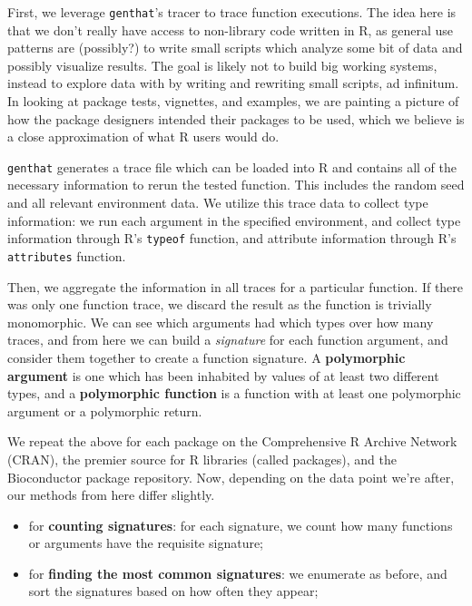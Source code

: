 \documentclass[acmsmall,10pt,review,anonymous]{acmart}\settopmatter{printfolios=true,printccs=false,printacmref=false}
\begin{document}
First, we leverage {\tt genthat}'s tracer to trace function executions.  The
idea here is that we don't really have access to non-library code written in
R, as general use patterns are (possibly?) to write small scripts which
analyze some bit of data and possibly visualize results.  The goal is likely
not to build big working systems, instead to explore data with by writing
and rewriting small scripts, ad infinitum.  In looking at package tests,
vignettes, and examples, we are painting a picture of how the package
designers intended their packages to be used, which we believe is a close
approximation of what R users would do.

{\tt genthat} generates a trace file which can be loaded into R and contains
all of the necessary information to rerun the tested function.  This
includes the random seed and all relevant environment data.  We utilize this
trace data to collect type information: we run each argument in the
specified environment, and collect type information through R's {\tt typeof}
function, and attribute information through R's {\tt attributes} function.

Then, we aggregate the information in all traces for a particular function.
If there was only one function trace, we discard the result as the function
is trivially monomorphic.  We can see which arguments had which types over
how many traces, and from here we can build a \textit{signature} for each
function argument, and consider them together to create a function
signature.  A \textbf{polymorphic argument} is one which has been inhabited
by values of at least two different types, and a \textbf{polymorphic
  function} is a function with at least one polymorphic argument or a
polymorphic return.

We repeat the above for each package on the Comprehensive R Archive Network
(CRAN), the premier source for R libraries (called packages), and the
Bioconductor package repository.  Now, depending on the data point we're
after, our methods from here differ slightly.

\begin{itemize}
    \item for \textbf{counting signatures}: for each signature, we count how
      many functions or arguments have the requisite signature;
    \item for \textbf{finding the most common signatures}: we enumerate as before, and sort the signatures based on how often they appear;
\end{itemize}
\end{document}
